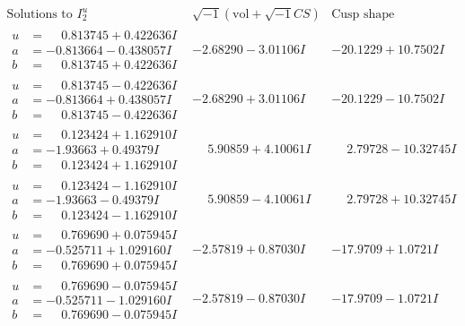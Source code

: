 \documentclass[1p]{elsarticle_modified}
\theoremstyle{definition}
\newcommand{\I}{\sqrt{-1}}
\begin{document}
$$\begin{array}{c|c|c}  
\text{Solutions to }I^u_{2}& \I (\text{vol} + \sqrt{-1}CS) & \text{Cusp shape}\\
 \hline 
\begin{aligned}
u &= \phantom{-}0.813745 + 0.422636 I \\
a &= -0.813664 - 0.438057 I \\
b &= \phantom{-}0.813745 + 0.422636 I\end{aligned}
 & -2.68290 - 3.01106 I & -20.1229 + 10.7502 I \\ \hline\begin{aligned}
u &= \phantom{-}0.813745 - 0.422636 I \\
a &= -0.813664 + 0.438057 I \\
b &= \phantom{-}0.813745 - 0.422636 I\end{aligned}
 & -2.68290 + 3.01106 I & -20.1229 - 10.7502 I \\ \hline\begin{aligned}
u &= \phantom{-}0.123424 + 1.162910 I \\
a &= -1.93663 + 0.49379 I \\
b &= \phantom{-}0.123424 + 1.162910 I\end{aligned}
 & \phantom{-}5.90859 + 4.10061 I & \phantom{-}2.79728 - 10.32745 I \\ \hline\begin{aligned}
u &= \phantom{-}0.123424 - 1.162910 I \\
a &= -1.93663 - 0.49379 I \\
b &= \phantom{-}0.123424 - 1.162910 I\end{aligned}
 & \phantom{-}5.90859 - 4.10061 I & \phantom{-}2.79728 + 10.32745 I \\ \hline\begin{aligned}
u &= \phantom{-}0.769690 + 0.075945 I \\
a &= -0.525711 + 1.029160 I \\
b &= \phantom{-}0.769690 + 0.075945 I\end{aligned}
 & -2.57819 + 0.87030 I & -17.9709 + 1.0721 I \\ \hline\begin{aligned}
u &= \phantom{-}0.769690 - 0.075945 I \\
a &= -0.525711 - 1.029160 I \\
b &= \phantom{-}0.769690 - 0.075945 I\end{aligned}
 & -2.57819 - 0.87030 I & -17.9709 - 1.0721 I \\ \hline\begin{aligned}

\end{aligned}
\end{array}$$
\end{document}
